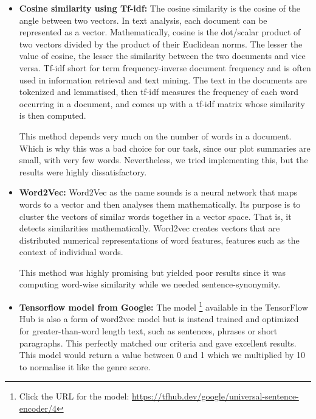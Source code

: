 \begin{itemize}
    \item \textbf{Cosine similarity using Tf-idf:} The cosine similarity is the cosine of the angle between two vectors. In text analysis, each document can be represented as a vector. Mathematically, cosine is the dot/scalar product of two vectors divided by the product of their Euclidean norms. The lesser the value of cosine, the lesser the similarity between the two documents and vice versa. Tf-idf short for term frequency-inverse document frequency and is often used in information retrieval and text mining. The text in the documents are tokenized and lemmatised, then  tf-idf measures the frequency of each word occurring in a document, and comes up with a tf-idf matrix whose similarity is then computed. 

    This method depends very much on the number of words in a document. Which is why this was a bad choice for our task, since our plot summaries are small, with very few words. Nevertheless, we tried implementing this, but the results were highly dissatisfactory. 

    \item \textbf{Word2Vec:} Word2Vec as the name sounds is a neural network that maps words to a vector and then analyses them mathematically. Its purpose is to cluster the vectors of similar words together in a vector space. That is, it detects similarities mathematically. Word2vec creates vectors that are distributed numerical representations of word features, features such as the context of individual words. 

    This method was highly promising but yielded poor results since it was computing word-wise similarity while we needed sentence-synonymity. 

    \item \textbf{Tensorflow model from Google: }The model \footnote{Click the URL for the model: \url{https://tfhub.dev/google/universal-sentence-encoder/4}} available in the TensorFlow Hub is also a form of word2vec model but is instead trained and optimized for greater-than-word length text, such as sentences, phrases or short paragraphs. This perfectly matched our criteria and gave excellent results. This model would return a value between 0 and 1 which we multiplied by 10 to normalise it like the genre score.

\end{itemize}
 

